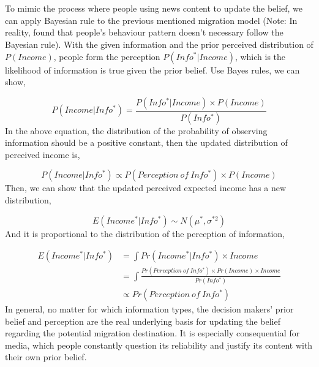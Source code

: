 \documentclass{article}
\begin{document}
\\~\\
To mimic the process where people using news content to update the belief, we can apply Bayesian rule to the previous mentioned migration model (Note: In reality, \textcite{Wiswall:2015wd} found that people's behaviour pattern doesn't necessary follow the Bayesian rule). With the given information and the prior perceived distribution of $P(Income)$, people form the perception $P(Info^*|Income)$, which is the likelihood of information is true given the prior belief. Use Bayes rules, we can show, 

\begin{equation}
    P(Income|Info^*)=\frac{P(Info^*|Income)\times P(Income)}{P(Info^*)}
\end{equation}
In the above equation, the distribution of the probability of observing information should be a positive constant, then the updated distribution of perceived income is, 

\begin{equation}
      P(Income|Info^*) \propto P(Perception\ of\ Info^*)\times P(Income)
\end{equation}
Then, we can show that the updated perceived expected income has a new distribution,

\begin{equation}
    E(Income^*|Info^*)\sim N(\mu^*, \sigma^{*2})
 \end{equation}   
And it is proportional to the distribution of the perception of information,

\begin{equation}
    \begin{aligned}
    E(Income^*|Info^*)&=\int Pr(Income^*|Info^*)\times Income\\
    &=\int \frac{Pr(Perception\ of\ Info^*)\times Pr(Income) \times Income}{Pr(Info^*)}\\
    &\propto Pr(Perception\ of\ Info^*)
    \end{aligned}
\end{equation}
In general, no matter for which information types, the decision makers' prior belief and perception are the real underlying basis for updating the belief regarding the potential migration destination. It is especially consequential for media, which people constantly question its reliability and justify its content with their own prior belief.
\end{document}
